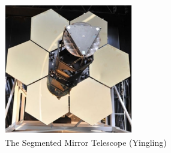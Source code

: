 \documentclass{aiaa-tc}
\begin{document}
\begin{figure}[htb]	%
 \centering
 \includegraphics[width=0.5\textwidth]{Figures/SMT}
 \caption{The Segmented Mirror Telescope (Yingling)}
 \label{SMT}
\end{figure}


\end{document}
